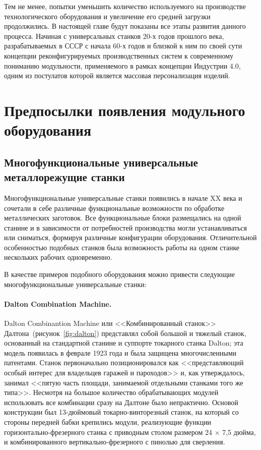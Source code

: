 Тем не менее, попытки уменьшить количество используемого на производстве технологического оборудования и увеличение его средней загрузки продолжились. В настоящей главе будут показаны все этапы развития данного процесса. Начиная с универсальных станков 20-х годов прошлого века, разрабатываемых в СССР с начала 60-х годов и близкой к ним по своей сути концепции реконфигурируемых производственных систем к современному пониманию модульности, применяемого в рамках концепции Индустрии 4.0, одним из постулатов которой является массовая персонализация изделий.

\section{Предпосылки появления модульного оборудования}

\subsection{Многофункциональные универсальные металлорежущие станки}\label{sec:ch1/multifunc-machines}

Многофункциональные универсальные станки появились в начале XX века и сочетали в себе различные функциональные возможности по обработке металлических заготовок. Все функциональные блоки размещались на одной станине и в зависимости от потребностей производства могли устанавливаться или сниматься, формируя различные конфигурации оборудования. Отличительной особенностью подобных станков была возможность работы на одном станке нескольких рабочих одновременно.

В качестве примеров подобного оборудования можно привести следующие многофункциональные универсальные станки:

\paragraph{Dalton Combination Machine.}

Dalton Combinantion Machine или <<Комбинированный станок>> Далтона~(рисунок~\cref{fig:dalton}) представлял собой большой и тяжелый станок, основанный на стандартной станине и суппорте токарного станка Dalton; эта модель появилась в феврале 1923 года и была защищена многочисленными патентами. Станок первоначально позиционировался как <<представляющий особый интерес для владельцев гаражей и пароходов>> и, как утверждалось, занимал <<пятую часть площади, занимаемой отдельными станками того же типа>>. Несмотря на большое количество обрабатывающих модулей использовать все комбинации сразу на Далтоне было непрактично. Основой конструкции был 13-дюймовый токарно-винторезный станок, на который со стороны передней бабки крепились модули, реализующие функции горизонтально-фрезерного станка с приводным столом размером 24 $\times$ 7,5 дюйма, и комбинированного вертикально-фрезерного с пинолью для сверления. 

